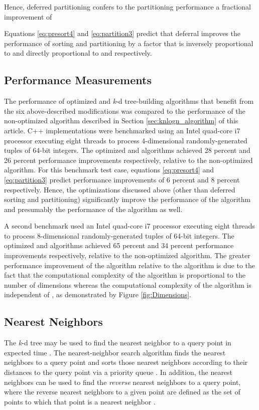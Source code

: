 \documentclass{sig-alternate}
\begin{document}
Hence, deferred partitioning confers to the partitioning performance a fractional improvement of


Equations \ref{eq:presort4} and \ref{eq:partition3} predict that deferral improves the performance of sorting and partitioning by a factor that is inversely proportional to  and directly proportional to  and  respectively.

\subsection{Performance Measurements}

The performance of optimized  and  \emph{k}-d tree-building algorithms that benefit from the six above-described modifications was compared to the performance of the non-optimized  algorithm described in Section \ref{sec:knlogn_algorithm} of this article. C++ implementations were benchmarked using an Intel quad-core i7 processor executing eight threads to process  4-dimensional randomly-generated tuples of 64-bit integers.  The optimized  and  algorithms achieved 28 percent and 26 percent performance improvements respectively, relative to the non-optimized  algorithm.  For this benchmark test case, equations \ref{eq:presort4} and \ref{eq:partition3} predict performance improvements of 6 percent and 8 percent respectively.  Hence, the optimizations discussed above (other than deferred sorting and partitioning) significantly improve the performance of the  algorithm and presumably the performance of the  algorithm as well.

A second benchmark used an Intel quad-core i7 processor executing eight threads to process  8-dimensional randomly-generated tuples of 64-bit integers.  The optimized  and  algorithms achieved 65 percent and 34 percent performance improvements respectively, relative to the non-optimized  algorithm.   The greater performance improvement of the  algorithm relative to the  algorithm is due to the fact that the computational complexity of the  algorithm is proportional to the number of dimensions  whereas the computational complexity of the  algorithm is independent of , as demonstrated by Figure \ref{fig:Dimensions}.

\subsection{Nearest Neighbors}
The \emph{k}-d tree may be used to find the nearest neighbor to a query point in  expected time \cite{Friedman}. The nearest-neighbor search algorithm finds the  nearest neighbors to a query point and sorts those  nearest neighbors according to their distances to the query point via a priority queue \cite{Sedgewick3}. In addition, the nearest neighbors can be used to find the \emph{reverse} nearest neighbors to a query point, where the reverse nearest neighbors to a given point are defined as the set of points to which that point is a nearest neighbor \cite{Korn}.
\end{document}
